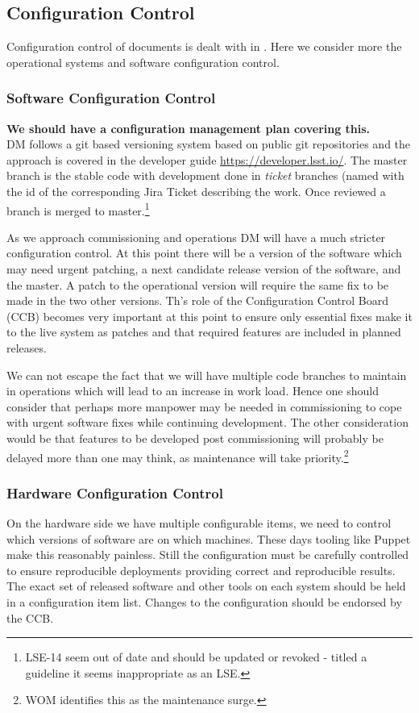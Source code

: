 \subsection {Configuration Control } \label{sect:config}
Configuration control of documents is dealt with in . Here we consider more the operational systems and software configuration control. 
\subsubsection{Software Configuration Control}
{\bf We should have a configuration management plan covering this.} \\

DM follows a git based versioning system based  on public git repositories and the approach is covered in the developer guide \url{https://developer.lsst.io/}.
The master branch is the stable code with development done in {\em ticket} branches (named with the id of the corresponding Jira Ticket describing the work. Once reviewed a branch is merged to master.\footnote{LSE-14 seem out of date and should be updated or revoked - titled a guideline it seems inappropriate as an LSE.}

As we approach commissioning and operations DM will have a much stricter configuration control. At this point there will be a version of the software which may need urgent patching, a
next candidate release version of the software, and the master. A patch to the operational version
will require the same fix to be made in the two other versions. Th's role of the Configuration Control Board (CCB) becomes very important at this point to ensure only essential fixes make it to the live system as patches and that required features are included in planned releases.


We  can not escape the fact that we  will have multiple code branches to maintain in operations which will lead to an increase in work load.
Hence one should consider that perhaps more manpower may be needed in commissioning to cope with urgent
software fixes while continuing development. The other consideration would be that features to
be developed post commissioning will probably be delayed more than one may think, as maintenance will take priority.\footnote{WOM identifies this as the maintenance surge.}

\subsubsection{Hardware Configuration Control}
On the hardware side we have multiple configurable items, we need to control which versions of software are on which machines. These days tooling like Puppet make this reasonably painless. Still the configuration  must be carefully controlled to ensure reproducible deployments providing correct and reproducible results. The exact set of released software and other tools on each system should be held in a configuration item list. 
Changes to the configuration should be endorsed by the CCB. 


